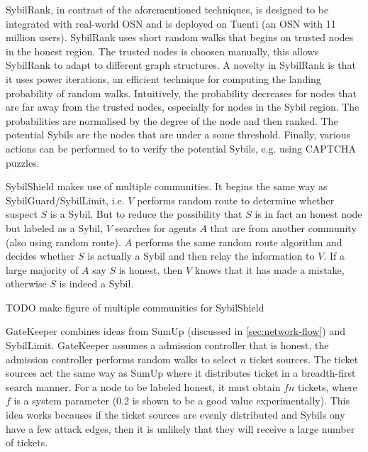 
SybilRank, in contrast of the aforementioned techniques, is designed to be
integrated with real-world OSN and is deployed on Tuenti (an OSN with 11 million
users)\cite{cao2012aiding}. SybilRank uses short random walks that begins on
trusted nodes in the honest region. The trusted nodes is choosen manually, this
allows SybilRank to adapt to different graph structures. A novelty in SybilRank
is that it uses power iterations, an efficient technique for computing the
landing probability of random walks. Intuitively, the probability decreases for
nodes that are far away from the trusted nodes, especially for nodes in the
Sybil region. The probabilities are normalised by the degree of the node and
then ranked. The potential Sybils are the nodes that are under a some threshold.
Finally, various actions can be performed to to verify the potential Sybils,
e.g. using CAPTCHA puzzles.

SybilShield\cite{shi2013sybilshield} makes use of multiple communities. It
begins the same way as SybilGuard/SybilLimit, i.e. $V$ performs random route to
determine whether suspect $S$ is a Sybil. But to reduce the possibility that $S$
is in fact an honest node but labeled as a Sybil, $V$ searches for agents $A$
that are from another community (also using random route). $A$ performs the same
random route algorithm and decides whether $S$ is actually a Sybil and then
relay the information to $V$. If a large majority of $A$ say $S$ is honest, then
$V$ knows that it has made a mistake, otherwise $S$ is indeed a Sybil.

TODO make figure of multiple communities for SybilShield

GateKeeper\cite{tran2011optimal} combines ideas from SumUp (discussed in
\autoref{sec:network-flow}) and SybilLimit. GateKeeper assumes a admission
controller that is honest, the admission controller performs random walks to
select $n$ ticket sources. The ticket sources act the same way as SumUp where it
distributes ticket in a breadth-first search manner. For a node to be labeled
honest, it must obtain $fn$ tickets, where $f$ is a system parameter (0.2 is
shown to be a good value experimentally). This idea works becauses if the ticket
sources are evenly distributed and Sybils ony have a few attack edges, then it
is unlikely that they will receive a large number of tickets.



